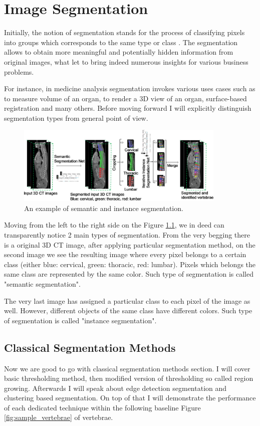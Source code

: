\chapter{Image Segmentation}
\label{ch:image_segmentation}
Initially, the notion of segmentation stands for the process of classifying pixels into groups which corresponds to the same type or class \cite{Margaritondo2011}. The segmentation allows to obtain more meaningful and potentially hidden information from original images, what let to bring indeed numerous insights for various business problems. 

For instance, in medicine analysis segmentation invokes various uses cases such as to measure volume of an organ, to render a 3D view of an organ, surface-based registration and many others. Before moving forward I will explicitly distinguish segmentation types from general point of view.

\begin{figure}[h]
    \centering
    \includegraphics[width=10cm]{images/semantic_instance_segmenattion.png}
    \caption{An example of semantic and instance segmentation.}
    \label{fig:image_segmentation}
\end{figure}

Moving from the left to the right side on the Figure \ref{fig:image_segmentation}, we in deed can transparently notice 2 main types of segmentation. From the very begging there is a original 3D CT image, after applying particular segmentation method, on the second image we see the resulting image where every pixel belongs to a certain class (either blue: cervical, green: thoracic, red: lumbar). Pixels which belongs the same class are represented by the same color. Such type of segmentation is called "semantic segmentation". 

The very last image has assigned a particular class to each pixel of the image as well. However, different objects of the same class have different colors. Such type of segmentation is called "instance segmentation".

\section{Classical Segmentation Methods} 
Now we are good to go with classical segmentation methods section. I will cover basic thresholding method, then modified version of thresholding so called region growing. Afterwards I will speak about edge detection segmentation and clustering based segmentation. On top of that I will demonstrate the performance of each dedicated technique within the following baseline Figure \ref{fig:sample_vertebrae} of vertebrae.


